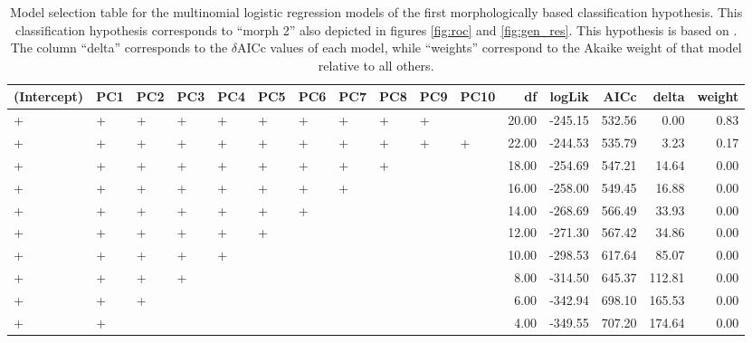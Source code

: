 \documentclass[12pt,letterpaper]{article}\usepackage{graphicx, color}
\begin{document}
\begin{table}
  \centering
{\small
\begin{tabular}{lllllllllllrrrrr}
  \hline
(Intercept) & PC1 & PC2 & PC3 & PC4 & PC5 & PC6 & PC7 & PC8 & PC9 & PC10 & df & logLik & AICc & delta & weight \\ 
  \hline
+ & + & + & + & + & + & + & + & + & + &  & 20.00 & -245.15 & 532.56 & 0.00 & 0.83 \\ 
  + & + & + & + & + & + & + & + & + & + & + & 22.00 & -244.53 & 535.79 & 3.23 & 0.17 \\ 
  + & + & + & + & + & + & + & + & + &  &  & 18.00 & -254.69 & 547.21 & 14.64 & 0.00 \\ 
  + & + & + & + & + & + & + & + &  &  &  & 16.00 & -258.00 & 549.45 & 16.88 & 0.00 \\ 
  + & + & + & + & + & + & + &  &  &  &  & 14.00 & -268.69 & 566.49 & 33.93 & 0.00 \\ 
  + & + & + & + & + & + &  &  &  &  &  & 12.00 & -271.30 & 567.42 & 34.86 & 0.00 \\ 
  + & + & + & + & + &  &  &  &  &  &  & 10.00 & -298.53 & 617.64 & 85.07 & 0.00 \\ 
  + & + & + & + &  &  &  &  &  &  &  & 8.00 & -314.50 & 645.37 & 112.81 & 0.00 \\ 
  + & + & + &  &  &  &  &  &  &  &  & 6.00 & -342.94 & 698.10 & 165.53 & 0.00 \\ 
  + & + &  &  &  &  &  &  &  &  &  & 4.00 & -349.55 & 707.20 & 174.64 & 0.00 \\ 
   \hline
\end{tabular}
}


  \caption{Model selection table for the multinomial logistic regression models of the first morphologically based classification hypothesis. This classification hypothesis corresponds to ``morph 2'' also depicted in figures \ref{fig:roc} and \ref{fig:gen_res}. This hypothesis is based on \citet{Seeliger1945}. The column ``delta'' corresponds to the \(\delta\)AICc values of each model, while ``weights'' correspond to the Akaike weight of that model relative to all others.}
  \label{tab:mod_sel_2}
\end{table}
\end{document}
